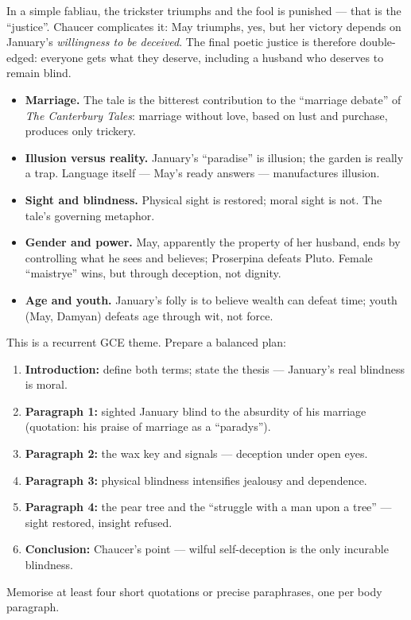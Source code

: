 \documentclass[11pt]{article}
\newcounter{popsec}
\newcounter{popsub}
\newcommand{\courssub}[1]{%
  \stepcounter{popsub}%
  \par\vspace{9pt}\noindent{\popxbold\fontsize{11.5}{13}\selectfont\color{popink}{\color{poporange}\thepopsec.\thepopsub}\hspace{6pt}#1}\par\nopagebreak\vspace{4pt}
}
\begin{document}
\begin{savaistu}
In a simple fabliau, the trickster triumphs and the fool is punished — that is the ``justice''. Chaucer complicates it: May triumphs, yes, but her victory depends on January's \emph{willingness to be deceived}. The final poetic justice is therefore double-edged: everyone gets what they deserve, including a husband who deserves to remain blind.
\end{savaistu}

\courssub{Synthesis of Themes}

\begin{itemize}
\item \textbf{Marriage.} The tale is the bitterest contribution to the ``marriage debate'' of \emph{The Canterbury Tales}: marriage without love, based on lust and purchase, produces only trickery.
\item \textbf{Illusion versus reality.} January's ``paradise'' is illusion; the garden is really a trap. Language itself — May's ready answers — manufactures illusion.
\item \textbf{Sight and blindness.} Physical sight is restored; moral sight is not. The tale's governing metaphor.
\item \textbf{Gender and power.} May, apparently the property of her husband, ends by controlling what he sees and believes; Proserpina defeats Pluto. Female ``maistrye'' wins, but through deception, not dignity.
\item \textbf{Age and youth.} January's folly is to believe wealth can defeat time; youth (May, Damyan) defeats age through wit, not force.
\end{itemize}

\begin{methode}
This is a recurrent GCE theme. Prepare a balanced plan:
\begin{enumerate}
\item \textbf{Introduction:} define both terms; state the thesis — January's real blindness is moral.
\item \textbf{Paragraph 1:} sighted January blind to the absurdity of his marriage (quotation: his praise of marriage as a ``paradys'').
\item \textbf{Paragraph 2:} the wax key and signals — deception under open eyes.
\item \textbf{Paragraph 3:} physical blindness intensifies jealousy and dependence.
\item \textbf{Paragraph 4:} the pear tree and the ``struggle with a man upon a tree'' — sight restored, insight refused.
\item \textbf{Conclusion:} Chaucer's point — wilful self-deception is the only incurable blindness.
\end{enumerate}
Memorise at least four short quotations or precise paraphrases, one per body paragraph.
\end{methode}
\end{document}
